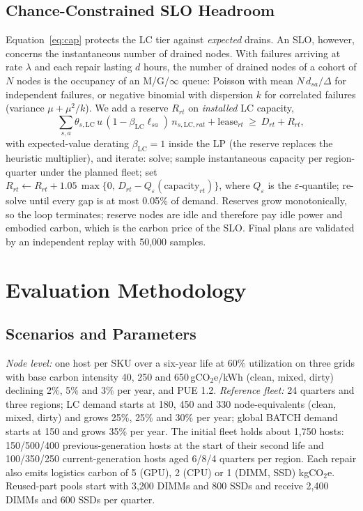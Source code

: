 \documentclass[11pt]{article}
\begin{document}
\subsection{Chance-Constrained SLO Headroom}
Equation~\eqref{eq:cap} protects the LC tier against \emph{expected} drains. An SLO, however, concerns the instantaneous number of drained nodes. With failures arriving at rate $\lambda$ and each repair lasting $d$ hours, the number of drained nodes of a cohort of $N$ nodes is the occupancy of an M/G/$\infty$ queue: Poisson with mean $N\,d_{sa}/\Delta$ for independent failures, or negative binomial with dispersion $k$ for correlated failures (variance $\mu+\mu^2/k$). We add a reserve $R_{rt}$ on \emph{installed} LC capacity,
\begin{equation}
\sum_{s,a}\theta_{s,\text{LC}}\,u\,(1-\beta_{\text{LC}}\ell_{sa})\,n_{s,\text{LC},rat}+\text{lease}_{rt}\ \ge\ D_{rt}+R_{rt},
\label{eq:reserve}
\end{equation}
with expected-value derating $\beta_{\text{LC}}=1$ inside the LP (the reserve replaces the heuristic multiplier), and iterate: solve; sample instantaneous capacity per region-quarter under the planned fleet; set $R_{rt}\leftarrow R_{rt}+1.05\,\max\{0,\,D_{rt}-Q_\varepsilon(\text{capacity}_{rt})\}$, where $Q_\varepsilon$ is the $\varepsilon$-quantile; re-solve until every gap is at most 0.05\% of demand. Reserves grow monotonically, so the loop terminates; reserve nodes are idle and therefore pay idle power and embodied carbon, which is the carbon price of the SLO. Final plans are validated by an independent replay with 50{,}000 samples.

\section{Evaluation Methodology}
\label{sec:method}
\subsection{Scenarios and Parameters}
\emph{Node level:} one host per SKU over a six-year life at 60\% utilization on three grids with base carbon intensity 40, 250 and 650\,gCO$_2$e/kWh (clean, mixed, dirty) declining 2\%, 5\% and 3\% per year, and PUE 1.2. \emph{Reference fleet:} 24 quarters and three regions; LC demand starts at 180, 450 and 330 node-equivalents (clean, mixed, dirty) and grows 25\%, 25\% and 30\% per year; global BATCH demand starts at 150 and grows 35\% per year. The initial fleet holds about 1{,}750 hosts: 150/500/400 previous-generation hosts at the start of their second life and 100/350/250 current-generation hosts aged 6/8/4 quarters per region. Each repair also emits logistics carbon of 5 (GPU), 2 (CPU) or 1 (DIMM, SSD) kgCO$_2$e. Reused-part pools start with 3{,}200 DIMMs and 800 SSDs and receive 2{,}400 DIMMs and 600 SSDs per quarter.
\end{document}
